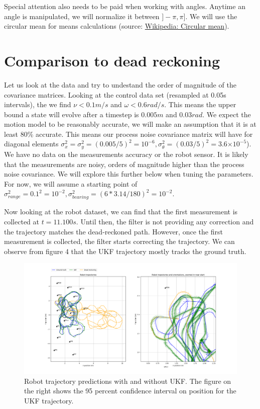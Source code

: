 \documentclass{article}
\providecommand{\e}[1]{\ensuremath{\times 10^{#1}}}
\begin{document}
Special attention also needs to be paid when working with angles. Anytime an angle is manipulated, we will normalize it between $]-\pi,\pi]$. We will use the circular mean for means calculations (source: \href{https://en.wikipedia.org/wiki/Circular_mean}{Wikipedia: Circular mean}).


\section{Comparison to dead reckoning}
Let us look at the data and try to undestand the order of magnitude of the covariance matrices.
Looking at the control data set (resampled at 0.05s intervals), the we find $\nu<0.1m/s$ and $\omega<0.6rad/s$. This means the upper bound a state will evolve after a timestep is $0.005m$ and $0.03rad$. We expect the motion model to be reasonably accurate, we will make an assumption that it is at least 80\% accurate. This means our process noise covariance matrix will have for diagonal elements $\sigma_x^2=\sigma_y^2=(0.005/5)^2=10^{-6},\sigma_\theta^2=(0.03/5)^2=3.6\e{-5}$). We have no data on the measurements accuracy or the robot sensor. It is likely that the measurements are noisy, orders of magnitude higher than the process noise covariance. We will explore this further below when tuning the parameters. For now, we will assume a starting point of $\sigma_{range}^2=0.1^2=10^{-2}, \sigma_{bearing}^2=(6*3.14/180)^2=10^{-2}$.


Now looking at the robot dataset, we can find that the first measurement is collected at $t=11.100s$. Until then, the filter is not providing any correction and the trajectory matches the dead-reckoned path.
However, once the first measurement is collected, the filter starts correcting the trajectory. We can observe from figure 4 that the UKF trajectory mostly tracks the ground truth.

\begin{figure}
\centering
\includegraphics[scale=0.3]{Figure_4.png}
\caption{Robot trajectory predictions with and without UKF. The figure on the right shows the 95 percent confidence interval on position for the UKF trajectory.}
\end{figure}
\end{document}
